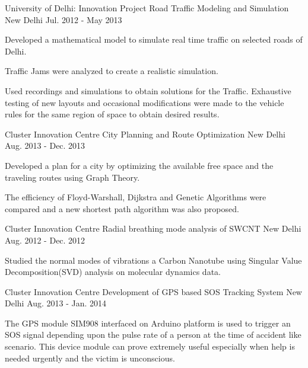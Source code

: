 \begin{cventries}
  \cventry
    {University of Delhi: Innovation Project}
    {Road Traffic Modeling and Simulation}
    {New Delhi}
    {Jul. 2012 - May 2013}
    {
      \begin{cvitems}
        \item {Developed a mathematical model to simulate real time traffic on selected roads of Delhi.}
        \item {Traffic Jams were analyzed to create a realistic simulation.}
        \item {Used recordings and simulations to obtain solutions for the Traffic. Exhaustive testing of new layouts and occasional modifications were made to the vehicle rules for the same region of space to obtain desired results.}
      \end{cvitems}
    }
    
  \cventry
    {Cluster Innovation Centre}
    {City Planning and Route Optimization}
    {New Delhi}
    {Aug. 2013 - Dec. 2013}
    {
      \begin{cvitems}
        \item {Developed a plan for a city by optimizing the available free space and the traveling routes using Graph Theory.} 		
        \item {The efficiency of Floyd-Warshall, Dijkstra and Genetic Algorithms were compared and a new shortest path algorithm was also proposed.}
      \end{cvitems}
    }
    
  \cventry
    {Cluster Innovation Centre}
    {Radial breathing mode analysis of SWCNT}
    {New Delhi}
    {Aug. 2012 - Dec. 2012}
    {
      \begin{cvitems}
        \item {Studied the normal modes of vibrations a Carbon Nanotube using Singular Value Decomposition(SVD) analysis on molecular dynamics data.}
      \end{cvitems}
    } 
    
  \cventry
    {Cluster Innovation Centre}
    {Development of GPS based SOS Tracking System}
    {New Delhi}
    {Aug. 2013 - Jan. 2014}
    {
      \begin{cvitems}
        \item {The GPS module SIM908 interfaced on Arduino platform is used to trigger an SOS signal depending upon the pulse rate of a person at the time of accident like scenario. This device module can prove extremely useful especially when help is needed urgently and the victim is unconscious.}
      \end{cvitems}
    }   
    
\end{cventries}
